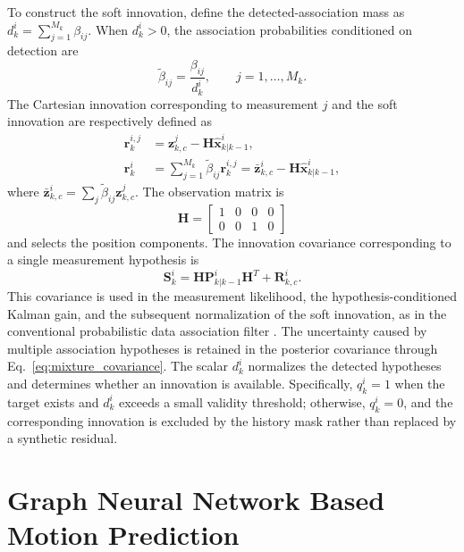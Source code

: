 \documentclass[10pt,doublecolumn]{IEEEtaes}
\begin{document}
To construct the soft innovation, define the detected-association mass as $d_k^i=\sum_{j=1}^{M_k}\beta_{ij}$. When $d_k^i>0$, the association probabilities conditioned on detection are
\begin{equation}
\tilde{\beta}_{ij}=\frac{\beta_{ij}}{d_k^i},\qquad j=1,\ldots,M_k.
\label{eq:conditional_association_probability}
\end{equation}
The Cartesian innovation corresponding to measurement $j$ and the soft innovation are respectively defined as
\begin{align}
\mathbf{r}_{k}^{i,j}&=\mathbf{z}_{k,c}^{j}-\mathbf{H}\hat{\mathbf{x}}_{k|k-1}^{i},\\
\mathbf{r}_{k}^{i}&=\sum_{j=1}^{M_k}\tilde{\beta}_{ij}\mathbf{r}_{k}^{i,j}
=\bar{\mathbf{z}}_{k,c}^{i}-\mathbf{H}\hat{\mathbf{x}}_{k|k-1}^{i},
\label{eq:innovation}
\end{align}
where $\bar{\mathbf{z}}_{k,c}^{i}=\sum_j\tilde{\beta}_{ij}\mathbf{z}_{k,c}^{j}$. The observation matrix is
\begin{equation}
\mathbf{H}=\begin{bmatrix}1&0&0&0\\0&0&1&0\end{bmatrix}
\end{equation}
and selects the position components. The innovation covariance corresponding to a single measurement hypothesis is
\begin{equation}
\mathbf{S}_{k}^{i}=\mathbf{H}\mathbf{P}_{k|k-1}^{i}\mathbf{H}^{T}+\mathbf{R}_{k,c}^{i}.
\label{eq:standard_innovation_covariance}
\end{equation}
This covariance is used in the measurement likelihood, the hypothesis-conditioned Kalman gain, and the subsequent normalization of the soft innovation, as in the conventional probabilistic data association filter \cite{barshalom2009probabilistic}. The uncertainty caused by multiple association hypotheses is retained in the posterior covariance through Eq.~\eqref{eq:mixture_covariance}. The scalar $d_k^i$ normalizes the detected hypotheses and determines whether an innovation is available. Specifically, $q_k^i=1$ when the target exists and $d_k^i$ exceeds a small validity threshold; otherwise, $q_k^i=0$, and the corresponding innovation is excluded by the history mask rather than replaced by a synthetic residual.

\section{Graph Neural Network Based Motion Prediction}
\end{document}
